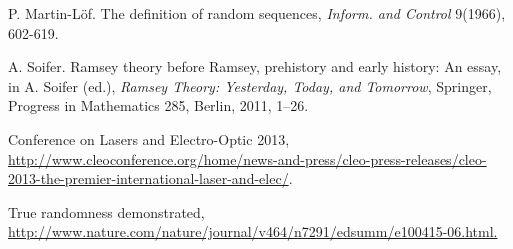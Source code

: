 \documentclass[%
 preprint,
 showpacs,
 showkeys,
 preprintnumbers,
  amsmath,amssymb,
  aps,
 pra,
  longbibliography,
  floatfix,
 ]{revtex4-1}
\theoremstyle{plain}
\begin{document}
\begin{thebibliography}{99}
P. Martin-L\"{o}f. The definition of random sequences, {\em Inform.
and Control} 9(1966), 602-619.


 A. Soifer. Ramsey theory before Ramsey, prehistory and early history: An essay,
 in  A. Soifer (ed.), {\em Ramsey Theory: Yesterday, Today, and Tomorrow}, Springer,  Progress in Mathematics 285, Berlin, 2011, 1--26.

   Conference on Lasers and Electro-Optic 2013, \url{http://www.cleoconference.org/}\newline  \url{home/news-and-press/cleo-press-releases/cleo-2013-the-premier-intern}\newline  \url{ational-laser-and-elec/}.

   True randomness demonstrated, \url{http://www.nature.com/nature/journal/v464/n7291/edsumm/e100415-06.html.}


\end{thebibliography}
\end{document}
